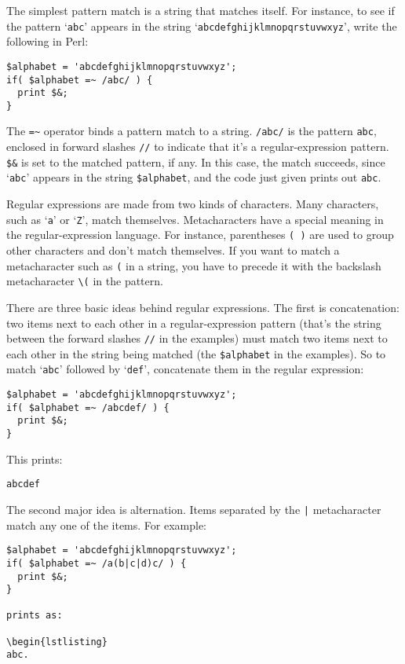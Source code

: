 The simplest pattern match is a string that matches itself. For instance, to see if the pattern `\verb|abc|' appears in the string `\verb|abcdefghijklmnopqrstuvwxyz|', write the following in Perl:

\begin{lstlisting}
$alphabet = 'abcdefghijklmnopqrstuvwxyz';
if( $alphabet =~ /abc/ ) {
  print $&;
}
\end{lstlisting}

The \verb|=~| operator binds a pattern match to a string. \verb|/abc/| is the pattern \verb|abc|, enclosed in forward slashes \verb|//| to indicate that it's a regular-expression pattern. \verb|$&| is set to the matched pattern, if any. In this case, the match succeeds, since `\verb|abc|' appears in the string \verb|$alphabet|, and the code just given prints out \verb|abc|.

Regular expressions are made from two kinds of characters. Many characters, such as `\verb|a|' or `\verb|Z|', match themselves. Metacharacters have a special meaning in the regular-expression language. For instance, parentheses \verb|( )| are used to group other characters and don't match themselves. If you want to match a metacharacter such as \verb|(| in a string, you have to precede it with the backslash metacharacter \verb|\(| in the pattern.

There are three basic ideas behind regular expressions. The first is concatenation: two items next to each other in a regular-expression pattern (that's the string between the forward slashes \verb|//| in the examples) must match two items next to each other in the string being matched (the \verb|$alphabet| in the examples). So to match `\verb|abc|' followed by `\verb|def|', concatenate them in the regular expression:

\begin{lstlisting}
$alphabet = 'abcdefghijklmnopqrstuvwxyz';
if( $alphabet =~ /abcdef/ ) {
  print $&; 
}
\end{lstlisting}

This prints:

\begin{lstlisting}
abcdef
\end{lstlisting}

The second major idea is alternation. Items separated by the \verb=|= metacharacter match any one of the items. For example:

\begin{lstlisting}
$alphabet = 'abcdefghijklmnopqrstuvwxyz';
if( $alphabet =~ /a(b|c|d)c/ ) {
  print $&;
}

prints as:

\begin{lstlisting}
abc.
\end{lstlisting}

